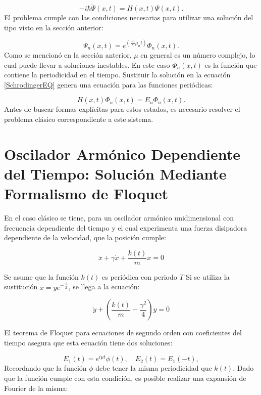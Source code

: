 \documentclass[a4paper,10pt]{report}
\begin{document}
\begin{equation}\label{SchrodingerEQ}
-i\hbar\dot{\Psi}(x,t) = H(x,t)\Psi(x,t).
\end{equation} El problema cumple con las condiciones necesarias para utilizar una solución del tipo visto en la sección anterior:

\begin{equation}
\Psi_n(x,t) = e^{(\frac{-i}{\hbar}\mu_nt)}\Phi_n(x,t).
\end{equation} Como se mencionó en la sección anterior, $\mu$ en general es un número complejo, lo cual puede llevar a soluciones inestables. En este caso $\Phi_n(x,t)$ es la función que contiene la periodicidad en el tiempo. Sustituir la solución en la ecuación \ref{SchrodingerEQ} genera una ecuación para las funciones periódicas:

\begin{equation}
H(x,t)\Phi_n(x,t)=E_n\Phi_n(x,t).
\end{equation} Antes de buscar formas explícitas para estos estados, es necesario resolver el problema clásico correspondiente a este sistema.

\section{Oscilador Armónico Dependiente del Tiempo: Solución Mediante Formalismo de Floquet}

En el caso clásico \cite{HanngiFM} se tiene, para un oscilador armónico unidimensional con frecuencia dependiente del tiempo y el cual experimenta una fuerza disipadora dependiente de la velocidad, que la posición cumple:

\begin{equation}
\ddot{x}+\gamma\dot{x}+\frac{k(t)}{m}x=0
\end{equation}

Se asume que la función $k(t)$ es periódica con periodo $T$ Si se utiliza la sustitución $x=ye^{-\frac{\gamma t}{2}}$, se llega a la ecuación:

\begin{equation}
\ddot{y} +(\frac{k(t)}{m}-\frac{\gamma^2}{4})y=0
\end{equation}

El teorema de Floquet para ecuaciones de segundo orden con coeficientes del tiempo \cite{HanngiFM} asegura que esta ecuación tiene dos soluciones:

\begin{equation}
E_1(t) = e^{i\mu t}\phi(t), \quad E_2(t)=E_1(-t),
\end{equation} Recordando que la función $\phi$ debe tener la misma periodicidad que $k(t)$. Dado que la función cumple con esta condición, es posible realizar una expansión de Fourier \cite{ArfkenMM} de la misma:
\end{document}
